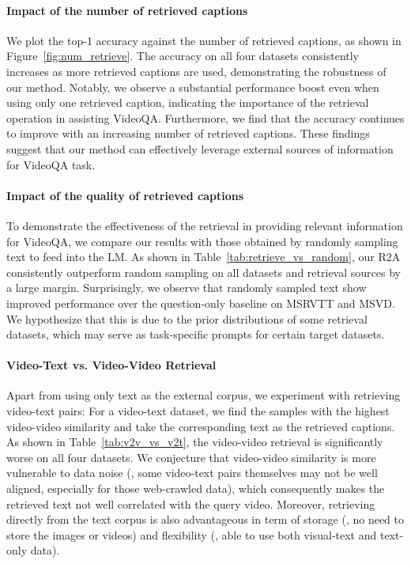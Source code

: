 \vspace{-3.5mm}

\paragraph{Impact of the number of retrieved captions}
We plot the top-1 accuracy against the number of retrieved captions, as shown in Figure~\ref{fig:num_retrieve}. The accuracy on all four datasets consistently increases as more retrieved captions are used, demonstrating the robustness of our method. Notably, we observe a substantial performance boost even when using only one retrieved caption, indicating the importance of the retrieval operation in assisting VideoQA. Furthermore, we find that the accuracy continues to improve with an increasing number of retrieved captions. These findings suggest that our method can effectively leverage external sources of information for VideoQA task.

\vspace{-3.5mm}

\paragraph{Impact of the quality of retrieved captions} To demonstrate the effectiveness of the retrieval in providing relevant information for VideoQA, we compare our results with those obtained by randomly sampling text to feed into the LM. As shown in Table~\ref{tab:retrieve_vs_random}, our R2A consistently outperform random sampling on all datasets and retrieval sources by a large margin. Surprisingly, we observe that randomly sampled text show improved performance over the question-only baseline on MSRVTT and MSVD. We hypothesize that this is due to the prior distributions of some retrieval datasets, which may serve as task-specific prompts \cite{coop} for certain target datasets.



\vspace{-3.5mm}

\paragraph{Video-Text vs. Video-Video Retrieval}
Apart from using only text as the external corpus, we experiment with retrieving video-text pairs: For a video-text dataset, we find the samples with the highest video-video similarity and take the corresponding text as the retrieved captions. As shown in Table~\ref{tab:v2v_vs_v2t}, the video-video retrieval is significantly worse on all four datasets.
We conjecture that video-video similarity is more vulnerable to data noise (\ie, some video-text pairs themselves may not be well aligned, especially for those web-crawled data), which consequently makes the retrieved text not well correlated with the query video.
Moreover, retrieving directly from the text corpus is also advantageous in term of storage (\ie, no need to store the images or videos) and flexibility (\ie, able to use both visual-text and text-only data).


